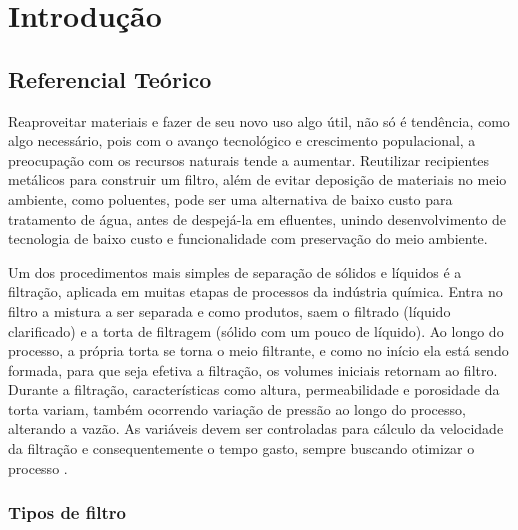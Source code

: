 \chapter{Introdução} \label{sec:intro}

\section{Referencial Teórico}\label{sec:refteo}

Reaproveitar materiais e fazer de seu novo uso algo útil, não só é tendência,
como algo necessário, pois com o avanço tecnológico e crescimento populacional,
a preocupação com os recursos naturais tende a aumentar. Reutilizar recipientes
metálicos para construir um filtro, além de evitar deposição de materiais no
meio ambiente, como poluentes, pode ser uma alternativa de baixo custo para
tratamento de água, antes de despejá-la em efluentes, unindo desenvolvimento de
tecnologia de baixo custo e funcionalidade com preservação do meio ambiente.

Um dos procedimentos mais simples de separação de sólidos e líquidos é a
filtração, aplicada em muitas etapas de processos da indústria química. Entra no
filtro a mistura a ser separada e como produtos, saem o filtrado (líquido
clarificado) e a torta de filtragem (sólido com um pouco de líquido). Ao longo
do processo, a própria torta se torna o meio filtrante, e como no início ela
está sendo formada, para que seja efetiva a filtração, os volumes iniciais
retornam ao filtro. Durante a filtração, características como altura,
permeabilidade e porosidade da torta variam, também ocorrendo variação de
pressão ao longo do processo, alterando a vazão. As variáveis devem ser
controladas para cálculo da velocidade da filtração e consequentemente o tempo
gasto, sempre buscando otimizar o processo .

\subsection{Tipos de filtro}

\label{subsec:tiposdefiltro}

